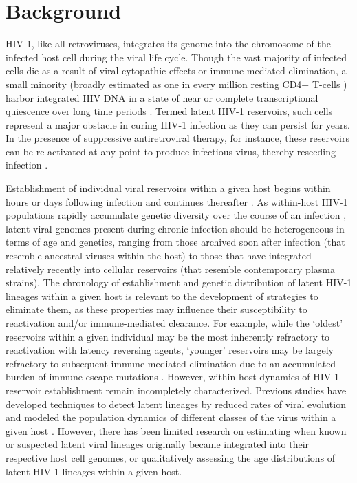 \documentclass[12pt]{article}
\begin{document}
\underline{}
\section * {Background} \label{sec:intro}

HIV-1, like all retroviruses, integrates its genome into the chromosome of the infected host cell during the viral life cycle.
Though the vast majority of infected cells die as a result of viral cytopathic effects or immune-mediated elimination, a small minority (broadly estimated as one in every million resting CD4+ T-cells \cite{Chun97,Finzi97}) harbor integrated HIV DNA in a state of near or complete transcriptional quiescence over long time periods \cite{Archin14,Pace11,Richman09}.
Termed latent HIV-1 reservoirs, such cells represent a major obstacle in curing HIV-1 infection as they can persist for years.
In the presence of suppressive antiretroviral therapy, for instance, these reservoirs can be re-activated at any point to produce infectious virus, thereby reseeding infection \cite{Richman09,Durand12,Joos08,Katlama13,Pomerantz03,Shen08}. 

Establishment of individual viral reservoirs within a given host  begins within hours or days following infection and continues thereafter \cite{Whitney14,Leford14}.
As within-host HIV-1 populations rapidly accumulate genetic diversity over the course of an infection \cite{Alizon13,Rambaut04,Shankarappa99}, latent viral genomes present during chronic infection should be heterogeneous in terms of age and genetics, ranging from those archived soon after infection (that resemble ancestral viruses within the host) to those that have integrated relatively recently into cellular reservoirs (that resemble contemporary plasma strains).
The chronology of establishment and genetic distribution of latent HIV-1 lineages within a given host is relevant to the development of strategies to eliminate them, as these properties may influence their susceptibility to reactivation and/or immune-mediated clearance.
For example, while the `oldest' reservoirs within a given individual may be the most inherently refractory to reactivation with latency reversing agents, `younger' reservoirs may be largely refractory to subsequent immune-mediated elimination due to an accumulated burden of immune escape mutations \cite{Deng15}.
However, within-host dynamics of HIV-1 reservoir establishment remain incompletely characterized.
Previous studies have developed techniques to detect latent lineages by reduced rates of viral evolution \cite{Immonen14} and modeled the population dynamics of different classes of the virus within a given host \cite{Althaus14}.
However, there has been limited research on estimating when known or suspected latent viral lineages originally became integrated into their respective host cell genomes, or qualitatively assessing the age distributions of latent HIV-1 lineages within a given host.  
\end{document}
